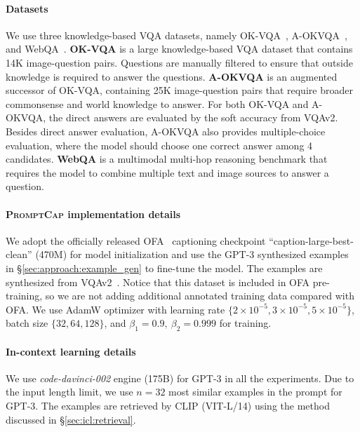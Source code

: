 \documentclass[10pt,twocolumn,letterpaper]{article}
\newcommand{\NAME}{\textsc{PromptCap}\xspace}
\begin{document}
\paragraph{Datasets} We use three knowledge-based VQA datasets, namely OK-VQA~\cite{marino2019okvqa}, A-OKVQA~\cite{schwenk2022aokvqa}, and WebQA~\cite{chang2022webqa}.
\textbf{OK-VQA}\cite{marino2019okvqa} is a large knowledge-based VQA dataset that contains 14K image-question pairs. Questions are manually filtered to ensure that outside knowledge is required to answer the questions.
\textbf{A-OKVQA}\cite{schwenk2022aokvqa} is an augmented successor of OK-VQA, containing 25K image-question pairs that require broader commonsense and world knowledge to answer.
For both OK-VQA and A-OKVQA, the direct answers are evaluated by the soft accuracy from VQAv2\cite{goyal2017making}.
Besides direct answer evaluation,
A-OKVQA also provides multiple-choice evaluation, where the model should choose one correct answer among 4 candidates. 
\textbf{WebQA} \cite{chang2022webqa} is a multimodal multi-hop reasoning benchmark that requires the model to combine multiple text and image sources to answer a question.

\vspace{-0.1in}
\paragraph{\NAME implementation details}
We adopt the officially released OFA~\cite{wang2022ofa} captioning checkpoint ``caption-large-best-clean'' (470M) for model initialization and use the GPT-3 synthesized examples in \S\ref{sec:approach:example_gen} to fine-tune the model. The examples are synthesized from VQAv2~\cite{antol2015vqa, goyal2017making}. Notice that this dataset is included in OFA pre-training, so we are not adding additional annotated training data compared with OFA. We use AdamW \cite{Kingma2015AdamAM} optimizer with learning rate $ \{2 \times 10^{-5}, 3 \times 10^{-5}, 5 \times 10^{-5} \} $, batch size $ \{32, 64, 128\}$, and $\beta_1=0.9,\ \beta_2=0.999$ for training.

\vspace{-0.1in}
\paragraph{In-context learning details} We use {\it code-davinci-002} engine (175B) for GPT-3 in all the experiments. Due to the input length limit, we use $n=32$ most similar examples in the prompt for GPT-3. The examples are retrieved by CLIP (VIT-L/14) using the method discussed in \S\ref{sec:icl:retrieval}.
\end{document}
